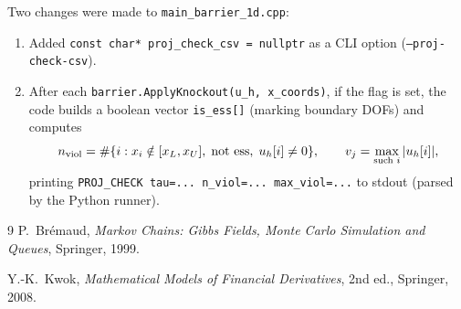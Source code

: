 \documentclass[11pt,a4paper]{article}
\begin{document}
Two changes were made to \texttt{main\_barrier\_1d.cpp}:

\begin{enumerate}
  \item Added \texttt{const char* proj\_check\_csv = nullptr} as a
        CLI option (\texttt{--proj-check-csv}).
  \item After each \texttt{barrier.ApplyKnockout(u\_h, x\_coords)},
        if the flag is set, the code builds a boolean vector
        \texttt{is\_ess[]} (marking boundary DOFs) and computes
        \[
          n_{\rm viol} = \#\{i : x_i \notin [x_L, x_U],\;
                         \text{not ess},\; u_h[i] \ne 0\},
          \qquad
          v_j = \max_{\text{such } i} |u_h[i]|,
        \]
        printing \texttt{PROJ\_CHECK tau=... n\_viol=... max\_viol=...}
        to stdout (parsed by the Python runner).
\end{enumerate}

\begin{thebibliography}{9}
P.~Br\'{e}maud,
\textit{Markov Chains: Gibbs Fields, Monte Carlo Simulation and Queues},
Springer, 1999.

Y.-K.~Kwok,
\textit{Mathematical Models of Financial Derivatives}, 2nd ed.,
Springer, 2008.
\end{thebibliography}
\end{document}
